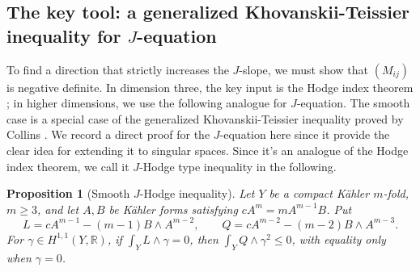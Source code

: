 \documentclass[reqno]{amsart}
\newcommand{\R}{\mathbb{R}}
\theoremstyle{plain}
\newtheorem{proposition}[thm]{Proposition}
\theoremstyle{remark}
\begin{document}
\subsection{The key tool: a generalized Khovanskii-Teissier inequality for \texorpdfstring{$J$}{J}-equation}
To find a direction that strictly increases the $J$-slope, we must
show that $(M_{ij})$ is negative definite. In dimension three, the key
input is the Hodge index theorem \cite{3d}; in higher dimensions, we
use the following analogue for $J$-equation. The smooth case is a special case of the generalized Khovanskii-Teissier inequality proved by Collins \cite{CT21}.  We record a direct proof for the $J$-equation here since it provide the clear idea for extending it to singular spaces. Since it's an analogue of the Hodge index theorem, we call it $J$-Hodge type inequality in the following. 
\begin{proposition}[Smooth $J$-Hodge inequality]
\label{prop:smooth-strict-hodge}
Let $Y$ be a compact K\"ahler $m$-fold, $m\geq3$, and let $A,B$ be K\"ahler
forms satisfying $cA^{m}=mA^{m-1}B$.  Put
\[
 L=cA^{m-1}-(m-1)B\wedge A^{m-2},\qquad
 Q=cA^{m-2}-(m-2)B\wedge A^{m-3}.
\]
For $\gamma\in H^{1,1}(Y,\R)$, if
$\int_YL\wedge\gamma=0$, then
$\int_YQ\wedge\gamma^2\leq0$, with equality only when
$\gamma=0$.
\end{proposition}
\end{document}
